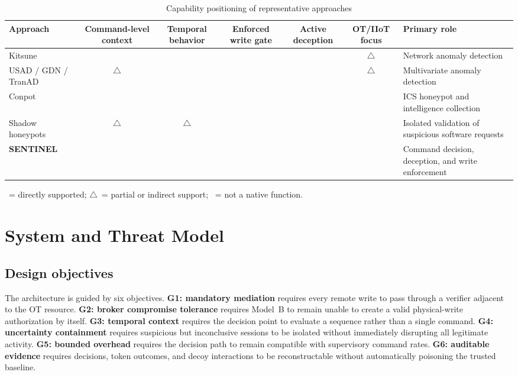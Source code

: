 \documentclass[journal]{IEEEtran}
\renewcommand{\arraystretch}{1.08}
\newcommand{\cmark}{\textcolor{green!50!black}{\checkmark}}
\newcommand{\xmark}{\textcolor{red!65!black}{\texttimes}}
\newcommand{\partialmark}{\textcolor{orange!80!black}{$\triangle$}}
\begin{document}
\begin{table}[t]
\centering
\caption{Capability positioning of representative approaches}
\label{tab:positioning}
\renewcommand{\arraystretch}{1.15}
\begin{tabularx}{\textwidth}{@{}XcccccX@{}}
\toprule
\textbf{Approach} & \textbf{Command-level context} & \textbf{Temporal behavior} & \textbf{Enforced write gate} & \textbf{Active deception} & \textbf{OT/IIoT focus} & \textbf{Primary role} \\
\midrule
Kitsune \cite{kitsune} & \xmark & \cmark & \xmark & \xmark & \partialmark & Network anomaly detection \\
USAD / GDN / TranAD \cite{usad,gdn,tranad} & \partialmark & \cmark & \xmark & \xmark & \partialmark & Multivariate anomaly detection \\
Conpot \cite{conpot} & \xmark & \xmark & \xmark & \cmark & \cmark & ICS honeypot and intelligence collection \\
Shadow honeypots \cite{shadow} & \partialmark & \partialmark & \xmark & \cmark & \xmark & Isolated validation of suspicious software requests \\
\textbf{SENTINEL} & \cmark & \cmark & \cmark & \cmark & \cmark & Command decision, deception, and write enforcement \\
\bottomrule
\end{tabularx}
\vspace{2pt}
{\footnotesize \cmark~= directly supported; \partialmark~= partial or indirect support; \xmark~= not a native function.}
\end{table}

\section{System and Threat Model}
\subsection{Design objectives}
The architecture is guided by six objectives. \textbf{G1: mandatory mediation} requires every remote write to pass through a verifier adjacent to the OT resource. \textbf{G2: broker compromise tolerance} requires Model~B to remain unable to create a valid physical-write authorization by itself. \textbf{G3: temporal context} requires the decision point to evaluate a sequence rather than a single command. \textbf{G4: uncertainty containment} requires suspicious but inconclusive sessions to be isolated without immediately disrupting all legitimate activity. \textbf{G5: bounded overhead} requires the decision path to remain compatible with supervisory command rates. \textbf{G6: auditable evidence} requires decisions, token outcomes, and decoy interactions to be reconstructable without automatically poisoning the trusted baseline.
\end{document}
